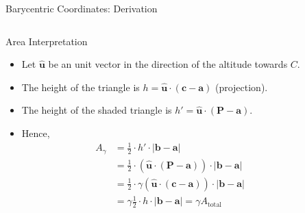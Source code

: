 \begin{frame}{Barycentric Coordinates: Derivation}
  \begin{columns}
    \begin{column}{0.65\textwidth}
      \begin{mathbox}{Area Interpretation}
        \begin{itemize}
            \small
          \item  Let $\hat{\mathbf{u}}$ be an unit vector in the direction of the altitude towards $C$.
            \pause
          \item  The height of the triangle is $h = \hat{\mathbf{u}} \cdot (\mathbf{c} - \mathbf{a})$ (projection).
            \pause
          \item  The height of the shaded triangle is $h' = \hat{\mathbf{u}} \cdot (\mathbf{P} - \mathbf{a})$.
            \pause
          \item  Hence,
            \begin{align*}
              A_{\gamma} &= \frac{1}{2} \cdot h' \cdot |\mathbf{b} - \mathbf{a}| \\
              &= \frac{1}{2} \cdot \left (\hat{\mathbf{u}} \cdot (\mathbf{P} - \mathbf{a}) \right ) \cdot |\mathbf{b} - \mathbf{a}|  \\
              &= \frac{1}{2} \cdot \gamma \left (\hat{\mathbf{u}} \cdot (\mathbf{c} - \mathbf{a}) \right ) \cdot |\mathbf{b} - \mathbf{a}|  \\
              &= \gamma \frac{1}{2} \cdot h \cdot |\mathbf{b} - \mathbf{a}| = \gamma A_{\text{total}}
            \end{align*}
        \end{itemize}
      \end{mathbox}
    \end{column}
    \begin{column}{0.35\textwidth}
\end{column}
\end{columns}
\end{frame}
